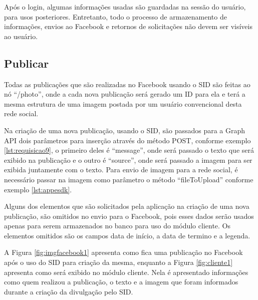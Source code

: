 Após o login, algumas informações usadas são guardadas na sessão do usuário, para usos posteriores. Entretanto, todo o processo de armazenamento de informações, envios ao Facebook e retornos de solicitações não devem ser visíveis ao usuário. 

\subsection{Publicar}
Todas as publicações que são realizadas no Facebook usando o SID são feitas ao nó ``/photo'', onde a cada nova publicação será gerado um ID para ela e terá a mesma estrutura de uma imagem postada por um usuário convencional desta rede social.

Na criação de uma nova publicação, usando o SID, são passados para a Graph API dois parâmetros para inserção através do método POST, conforme exemplo \ref{lst:requisicao9}, o primeiro deles é “message”, onde será passado o texto que será exibido na publicação e o outro é “source”, onde será passado a imagem para ser exibida juntamente com o texto. Para envio de imagem para a rede social, é necessário passar na imagem como parâmetro o método “fileToUpload” conforme exemplo \ref{lst:appesdk}. 

Alguns dos elementos que são solicitados pela aplicação na criação de uma nova publicação, são omitidos no envio para o Facebook, pois esses dados serão usados apenas para serem armazenados no banco para uso do módulo cliente. Os elementos omitidos são os campos data de início, a data de termino e a legenda. 

A Figura \ref{fig:imgfacebook1} apresenta como fica uma publicação no Facebook após o uso do SID para criação da mesma, enquanto a Figura \ref{fig:cliente1} apresenta como será exibido no módulo cliente. Nela é apresentado informações como quem realizou a publicação, o texto e a imagem que foram informados durante a criação da divulgação pelo SID.

